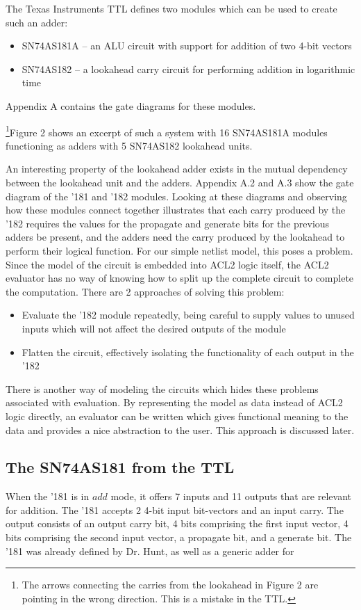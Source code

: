 \documentclass[fleqn,10pt]{SelfArx} %
\begin{document}
The Texas Instruments TTL\cite{TTL} defines two modules which can be used to create such an adder:
\begin{itemize}
\item SN74AS181A -- an ALU circuit with support for addition of two 4-bit vectors
\item SN74AS182 -- a lookahead carry circuit for performing addition in logarithmic time
\end{itemize}

Appendix A contains the gate diagrams for these modules.

\footnote{The arrows connecting the carries from the lookahead in Figure 2 are pointing in the wrong direction. This is a mistake in the TTL.}Figure 2 shows an excerpt of such a system with 16 SN74AS181A modules functioning as adders with 5 SN74AS182 lookahead units.

An interesting property of the lookahead adder exists in the mutual dependency between the lookahead unit and the adders. Appendix A.2 and A.3 show the gate diagram of the '181 and '182 modules. Looking at these diagrams and observing how these modules connect together illustrates that each carry produced by the '182 requires the values for the propagate and generate bits for the previous adders be present, and the adders need the carry produced by the lookahead to perform their logical function. For our simple netlist model, this poses a problem. Since the model of the circuit is embedded into ACL2 logic itself, the ACL2 evaluator has no way of knowing how to split up the complete circuit to complete the computation. There are 2 approaches of solving this problem:
\begin{itemize}
\item Evaluate the '182 module repeatedly, being careful to supply values to unused inputs which will not affect the desired outputs of the module
\item Flatten the circuit, effectively isolating the functionality of each output in the '182
\end{itemize}

There is another way of modeling the circuits which hides these problems associated with evaluation. By representing the model as data instead of ACL2 logic directly, an evaluator can be written which gives functional meaning to the data and provides a nice abstraction to the user. This approach is discussed later.

\subsection{The SN74AS181 from the TTL}
When the '181 is in $add$ mode, it offers 7 inputs and 11 outputs that are relevant for addition. The '181 accepts 2 4-bit input bit-vectors and an input carry. The output consists of an output carry bit, 4 bits comprising the first input vector, 4 bits comprising the second input vector, a propagate bit, and a generate bit. The '181 was already defined by Dr. Hunt, as well as a generic adder for
\end{document}
